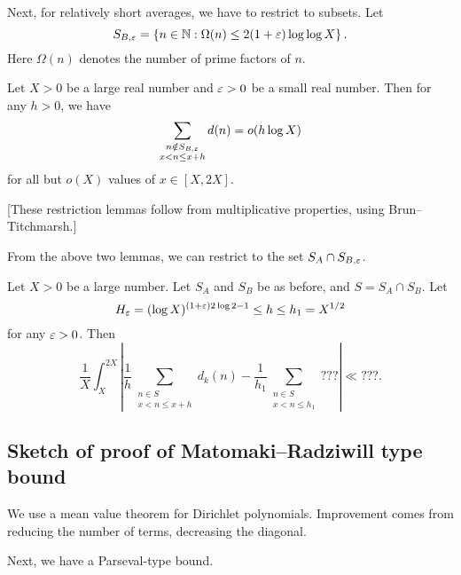 \documentclass[reqno]{amsart} 
\begin{document}
Next, for relatively short averages, we have to restrict to subsets.  Let
\begin{equation*}
S_{B, \varepsilon } = \left\{ n \in \mathbb{N} : \Omega (n) \leq 2 (1 + \varepsilon ) \log \log X \right\}.
\end{equation*}
Here $\Omega (n)$ denotes the number of prime factors of $n$.
\begin{lemma}
  Let $X > 0$ be a large real number and $\varepsilon > 0$ be a small real number.  Then for any $h > 0$, we have
  \begin{equation*}
    \sum_{
      \substack{
        n \notin S_{B , \varepsilon }  \\
         x < n \leq x + h 
      }
    } d (n) = o (h \log X)
  \end{equation*}
  for all but $o(X)$ values of $x \in [X, 2 X]$.
\end{lemma}

[These restriction lemmas follow from multiplicative properties, using Brun--Titchmarsh.]

From the above two lemmas, we can restrict to the set $S_A \cap S_{B, \varepsilon }$.
\begin{proposition}
  Let $X > 0$ be a large number.  Let $S_A $ and $S_B $ be as before, and $S = S_A \cap S_B$.  Let
  \begin{equation*}
H_\varepsilon = (\log X )^{(1 + \varepsilon )2 \log 2 - 1} \leq h \leq h_1 = X^{1/2} 
\end{equation*}
for any $\varepsilon > 0$.  Then
\begin{equation*}
  \frac{1}{X} \int_X^{2 X } \left\lvert \frac{1}{h} \sum_{
      \substack{
        n \in S  \\
        x < n \leq x + h
      }
    }
    d_k (n)
    - \frac{1}{ h_1 }
    \sum_{
      \substack{
        n \in S  \\
         x < n \leq h_1 
      }
    }
    ???
  \right\rvert
  \ll
  ???.
\end{equation*}
\end{proposition}

\subsection{Sketch of proof of Matomaki--Radziwill type bound}
We use a mean value theorem for Dirichlet polynomials.  Improvement comes from reducing the number of terms, decreasing the diagonal.

Next, we have a Parseval-type bound.
\end{document}
